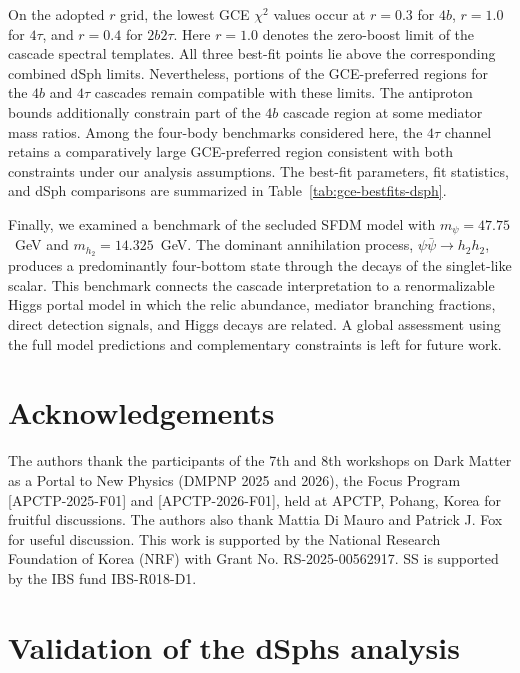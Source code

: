 \documentclass[superscriptaddress,
showpacs,preprintnumbers,nofootinbib,eqsecnum,amsmath,amssymb,aps,11pt, groupedaddress, floatfix]{revtex4-2}
\begin{document}
On the adopted $r$ grid, the lowest GCE $\chi^2$ values occur at $r=0.3$ for $4b$, $r=1.0$ for $4\tau$, and
$r=0.4$ for $2b2\tau$.
Here $r=1.0$ denotes the zero-boost limit of the cascade spectral templates.
All three best-fit points lie above the corresponding combined dSph limits.
Nevertheless, portions of the GCE-preferred regions for the $4b$ and $4\tau$ cascades remain compatible with these limits.
The antiproton bounds additionally constrain part of the $4b$ cascade region at some mediator mass ratios.
Among the four-body benchmarks considered here, the $4\tau$ channel retains a comparatively large GCE-preferred region consistent with both constraints under our analysis assumptions.
The best-fit parameters, fit statistics, and dSph comparisons are summarized in Table~\ref{tab:gce-bestfits-dsph}.

Finally, we examined a benchmark of the secluded SFDM model with $m_\psi=47.75$~GeV and $m_{h_2}=14.325$~GeV.
The dominant annihilation process,
$\psi \bar \psi \to h_2 h_2$, produces a predominantly four-bottom state through the decays of the
singlet-like scalar.
This benchmark connects the cascade interpretation to a renormalizable Higgs portal model in which the
relic abundance, mediator branching fractions, direct detection signals, and Higgs decays are related.
A global assessment using the full model predictions and complementary constraints is left for future work.



\section*{Acknowledgements}

The authors thank the participants of the 7th and 8th workshops on Dark Matter as a Portal to New Physics (DMPNP 2025 and 2026), the Focus Program [APCTP-2025-F01] and [APCTP-2026-F01], held at APCTP, Pohang, Korea for fruitful discussions.
The authors also thank Mattia Di Mauro and Patrick J. Fox for useful discussion.
This work is supported by the National Research Foundation of Korea (NRF) with Grant No. RS-2025-00562917.
SS is supported by the IBS fund IBS-R018-D1.

\appendix



\section{Validation of the dSphs analysis}
\label{app:validation}
\end{document}
